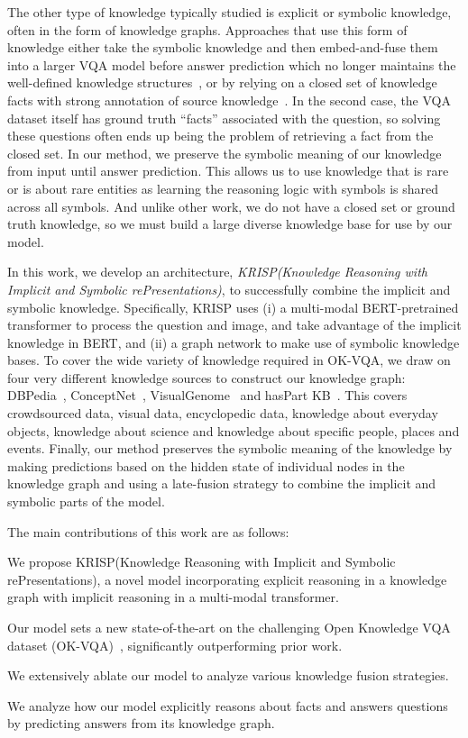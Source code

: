 \documentclass[final]{cvpr}
\providecommand{\ModelName}{KRISP\xspace}
\providecommand{\ModelNameLong}{Knowledge Reasoning with Implicit and  Symbolic rePresentations\xspace}
\providecommand{\sectionvspace}{\vspace{-0cm}}
\begin{document}
The other type of knowledge typically studied 
is explicit or symbolic knowledge, often in the form of
knowledge graphs. 
Approaches that use this form of knowledge either take the symbolic knowledge and then embed-and-fuse
them into a larger VQA model before answer prediction which no longer maintains the well-defined knowledge structures~\cite{marino19cvpr, guohao20mm}, or by relying on a closed set of knowledge facts with strong annotation of source knowledge~\cite{narasimhan2018out, wang17b, wu16}. In the second case, the VQA dataset itself has ground truth ``facts'' associated with the question, so solving these questions often ends up being the problem of retrieving a fact from the closed set.
In our method, we preserve the symbolic meaning of our knowledge from input until answer prediction. This allows us to use knowledge that is rare or is about rare entities as learning the reasoning logic with symbols is shared across all symbols.
And unlike other work, we do not have a closed set or ground truth knowledge, so we must build a large diverse knowledge base for use by our model.

In this work, we develop an architecture, \emph{\ModelName (\ModelNameLong)}, to successfully combine the implicit and symbolic knowledge. 
Specifically, \ModelName uses (i) a multi-modal BERT-pretrained transformer to process the question and image, and take advantage of the implicit knowledge in BERT, and (ii) a graph network to make use of symbolic knowledge bases. 
To cover the wide variety of knowledge required in OK-VQA, we draw on four very different knowledge sources to construct our knowledge graph: DBPedia~\cite{auer2007dbpedia}, ConceptNet~\cite{liu2004conceptnet}, VisualGenome~\cite{krishnavisualgenome} and hasPart KB~\cite{bhakthavatsalam2020dogs}.
This covers crowdsourced data, visual data, encyclopedic data, knowledge about everyday objects, knowledge about science and knowledge about specific people, places and events.
Finally, our method preserves the symbolic meaning of the knowledge by making predictions based on the hidden state of individual nodes in the knowledge graph
and using a late-fusion strategy to combine the implicit and symbolic parts of the model.

The main contributions of this work are as follows:
\begin{compactenum}
    \item We propose \ModelName (\ModelNameLong), a novel model incorporating explicit reasoning in a knowledge graph with implicit reasoning in a multi-modal transformer.
    \item Our model sets a new state-of-the-art on the challenging Open Knowledge VQA dataset (OK-VQA)~\cite{marino19cvpr}, significantly outperforming prior work.
    \item We extensively ablate our model to analyze various knowledge fusion strategies.
    \item We analyze how our model explicitly reasons about facts and answers questions by predicting answers from its knowledge graph. 
\end{compactenum}
\sectionvspace
\end{document}

